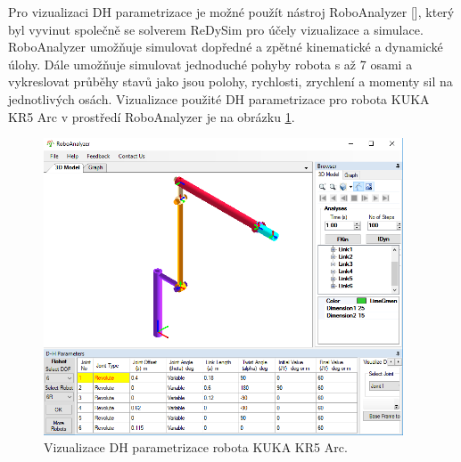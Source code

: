 Pro vizualizaci DH parametrizace je možné použít nástroj RoboAnalyzer [\cite{roboanalyzer}], který byl vyvinut společně se solverem ReDySim pro účely vizualizace a simulace. RoboAnalyzer umožňuje simulovat dopředné a zpětné kinematické a dynamické úlohy. Dále umožňuje simulovat jednoduché pohyby robota s až 7 osami a vykreslovat průběhy stavů jako jsou polohy, rychlosti, zrychlení a momenty sil na jednotlivých osách. Vizualizace použité DH parametrizace pro robota KUKA KR5 Arc v prostředí RoboAnalyzer je na obrázku \ref{dh_kuka_pic}.
\\
\begin{figure}[ht]
\includegraphics[width=0.95\textwidth]{pic_dh_kuka}
\caption{Vizualizace DH parametrizace robota KUKA KR5 Arc.}
\label{dh_kuka_pic}
\end{figure}

